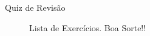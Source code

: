 \begin{frame}{Quiz de Revisão}
    \begin{figure}[h]
        \centering
        
        Lista de Exercícios.
        Boa Sorte!!
    \end{figure}
\end{frame}